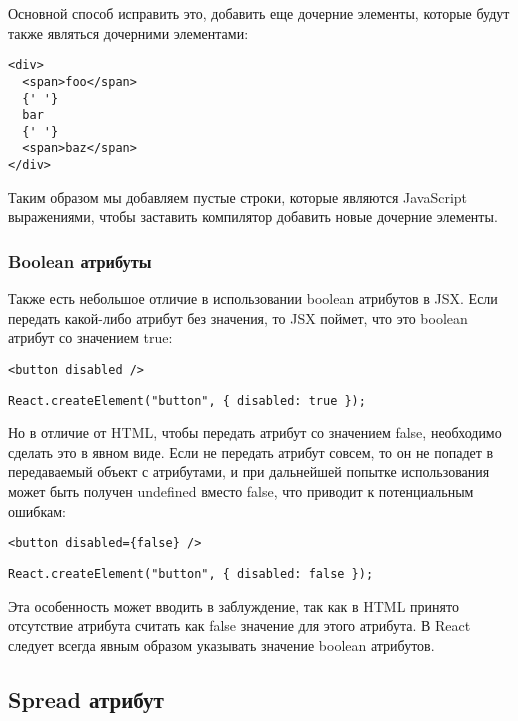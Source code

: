 Основной способ исправить это, добавить еще дочерние элементы, которые будут также являться дочерними элементами:

\begin{lstlisting}
<div>
  <span>foo</span>
  {' '}
  bar
  {' '}
  <span>baz</span>
</div>
\end{lstlisting}

Таким образом мы добавляем пустые строки, которые являются JavaScript выражениями, чтобы заставить компилятор добавить новые дочерние элементы.

\subsubsection{Boolean атрибуты}

Также есть небольшое отличие в использовании boolean атрибутов в JSX. Если передать какой-либо атрибут без значения, то JSX поймет, что это boolean атрибут со значением true:

\begin{lstlisting}
<button disabled />
\end{lstlisting}

\begin{lstlisting}
React.createElement("button", { disabled: true });
\end{lstlisting}
   
Но в отличие от HTML, чтобы передать атрибут со значением false, необходимо сделать это в явном виде. Если не передать атрибут совсем, то он не попадет в передаваемый объект с атрибутами, и при дальнейшей попытке использования может быть получен undefined вместо false, что приводит к потенциальным ошибкам:

\begin{lstlisting}
<button disabled={false} />
\end{lstlisting}

\begin{lstlisting}
React.createElement("button", { disabled: false });
\end{lstlisting}
   
Эта особенность может вводить в заблуждение, так как в HTML принято отсутствие атрибута считать как false значение для этого атрибута. В React следует всегда явным образом указывать значение boolean атрибутов.

\subsection{Spread атрибут}

